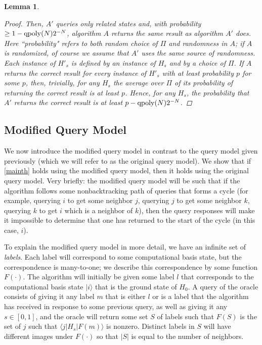 \documentclass[letterpaper,onecolumn]{quantumarticle}
\newtheorem{lemma}{Lemma}
\begin{document}
\begin{lemma}
\begin{proof}
Then, $A'$ queries only related states and, with probability $\geq 1-{\rm qpoly}(N) 2^{-N}$, algorithm $A$ returns the same result as algorithm $A'$ does.  Here ``probability" refers to both random choice of $\Pi$ and randomness in $A$; if $A$ is randomized, of course we assume that $A'$ uses the same source of randomness.
Each instance of $H'_s$ is defined by an instance of $H_s$ and by a choice of $\Pi$. 
If $A$ returns the correct result for every instance of $H'_s$ with at least probability $p$ for some $p$, then, trivially, for any $H_s$ the average over $\Pi$ of its probability of returning the correct result is at least $p$.  Hence, for any $H_s$, the probability that $A'$ returns the correct result is at least $p-{\rm qpoly}(N) 2^{-N}$.
\end{proof}
\end{lemma}





\subsection{Modified Query Model}
\label{mqm}
We now introduce the modified query model
in contrast to the query model given previously (which we will refer to as the original query model).
We show that if  \cref{mainth} holds using the modified query model, then it holds using the original query model.
Very briefly: the modified query model will be such that if the algorithm follows some nonbacktracking path of queries that forms a cycle (for example, querying $i$ to get some neighbor $j$, querying $j$ to get some neighbor $k$, querying $k$ to get $i$ which is a neighbor of $k$), then the query responses will make it impossible to determine that one has returned to the start of the cycle (in this case, $i$).




To explain the modified query model in more detail, we have an infinite set of {\it labels}.  Each label will correspond to some computational basis state, but the correspondence is many-to-one; we describe this correspondence by some function $F(\cdot)$.  The algorithm will initially be given some label $l$ that corresponds to the computational basis state $|i\rangle$ that is the ground state of $H_0$.  
A query of the oracle consists of giving it any label $m$ that is either $l$ or is a label that the algorithm has received in response to some previous query, as well as giving it any $s\in [0,1]$, and the oracle will return 
some set $S$ of labels such that $F(S)$ is
the set of $j$ such that $\langle j | H_s | F(m) \rangle$ is nonzero.  
Distinct labels in $S$ will have different images under $F(\cdot)$ so that $|S|$ is equal to the number of neighbors.
\end{document}
